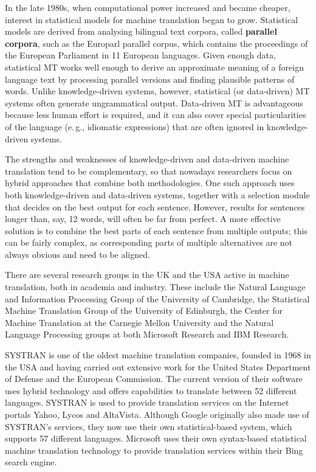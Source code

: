 \begin{multicols}{2}
In the late 1980s, when computational power increased and became cheaper, interest in statistical models for machine translation began to grow. Statistical models are derived from analysing bilingual text corpora, called \textbf{parallel corpora}, such as the Europarl parallel corpus, which contains the proceedings of the European Parliament in 11 European languages. Given enough data, statistical MT works well enough to derive an approximate meaning of a foreign language text by processing parallel versions and finding plausible patterns of words. Unlike knowledge-driven systems, however, statistical (or data-driven) MT systems often generate ungrammatical output. Data-driven MT is advantageous because less human effort is required, and it can also cover special particularities of the language (e.\,g., idiomatic expressions) that are often ignored in knowledge-driven systems.

The strengths and weaknesses of knowledge-driven and data-driven machine translation tend to be complementary, so that nowadays researchers focus on hybrid approaches that combine both methodologies. One such approach uses both knowledge-driven and data-driven systems, together with a selection module that decides on the best output for each sentence. However, results for sentences longer than, say, 12 words, will often be far from perfect. A more effective solution is to combine the best parts of each sentence from multiple outputs; this can be fairly complex, as corresponding parts of multiple alternatives are not always obvious and need to be aligned. 

There are several research groups in the UK and the USA active in machine translation, both in academia and industry. These include the Natural Language and Information Processing Group of the University of Cambridge, the Statistical Machine Translation Group of the University of Edinburgh, the Center for Machine Translation at the Carnegie Mellon University and the Natural Language Processing groups at both Microsoft Research and IBM Research. 

SYSTRAN is one of the oldest machine translation companies, founded in 1968 in the USA and having carried out extensive work for the United States Department of Defense and the European Commission. The current version of their software uses hybrid technology and offers capabilities to translate between 52 different languages. SYSTRAN is used to provide translation services on the Internet portals Yahoo, Lycos and AltaVista. Although Google originally also made use of SYSTRAN's services, they now use their own statistical-based system, which supports 57 different languages. Microsoft uses their own syntax-based statistical machine translation technology to provide translation services within their Bing search engine. 


\end{multicols}
